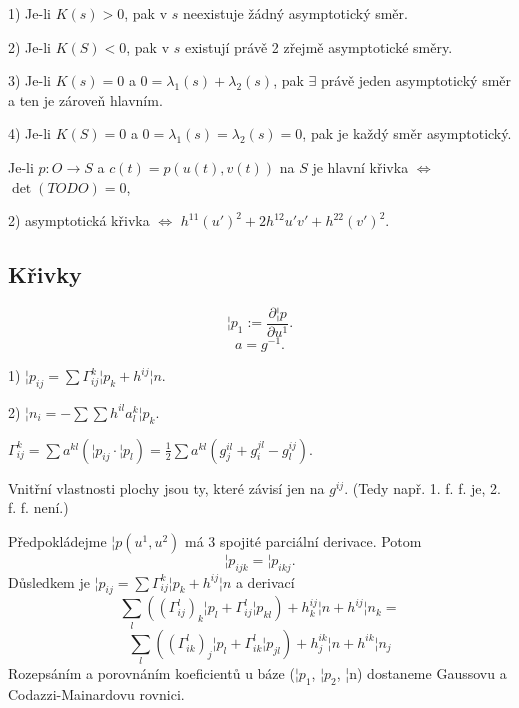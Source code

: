 \documentclass[12pt]{article}                   %
\begin{document}
        \begin{veta}
            1) Je-li $K(s)>0$, pak v $s$ neexistuje žádný asymptotický směr.

            2) Je-li $K(S) < 0$, pak v $s$ existují právě 2 zřejmě asymptotické směry.
            
            3) Je-li $K(s) = 0$ a $0 = \lambda_1(s) + \lambda_2(s)$, pak $\exists$ právě jeden asymptotický směr a ten je zároveň hlavním.

            4) Je-li $K(S) = 0$ a $0 = \lambda_1(s) = \lambda_2(s) = 0$, pak je každý směr asymptotický.
        \end{veta}

        \begin{veta}
            Je-li $p: O \rightarrow S$ a $c(t) = p(u(t), v(t))$ na $S$ je hlavní křivka $\Leftrightarrow$ $\det (TODO) = 0$,

            2) asymptotická křivka $\Leftrightarrow$ $h^{11}(u')^2 + 2h^{12}u'v' + h^{22}(v')^2$.
        \end{veta}


    \subsection{Křivky}
        \begin{poznamka}[Značení]
            $$ ¦p_1 := \frac{\partial ¦p}{\partial u^1}. $$
            $$ a = g^{-1}. $$ 
        \end{poznamka}

        \begin{lemma}
            1) $¦p_{ij} = \sum \Gamma_{ij}^k ¦p_k + h^{ij}¦n$.

            2) $¦n_i = - \sum \sum h^{il} a^k_l ¦p_k$.
        \end{lemma}

        \begin{definice}
            $\Gamma_{ij}^k = \sum a^{kl} (¦p_{ij}·¦p_l) = \frac{1}{2} \sum a^{kl} (g_j^{il} + g_i^{jl} - g_l^{ij})$.
        \end{definice}

        \begin{poznamka}
            Vnitřní vlastnosti plochy jsou ty, které závisí jen na $g^{ij}$. (Tedy např. 1. f. f. je, 2. f. f. není.)
        \end{poznamka}

        \begin{poznamka}
            Předpokládejme $¦p(u^1, u^2)$ má 3 spojité parciální derivace. Potom
            $$ ¦p_{ijk} = ¦p_{ikj}. $$ 
            Důsledkem je $¦p_{ij} = \sum \Gamma_{ij}^k ¦p_k + h^{ij}¦n$ a derivací
            $$ \sum_l ((\Gamma^l_{ij})_k¦p_l + \Gamma_{ij}^l¦p_{kl}) + h_k^{ij}¦n + h^{ij}¦n_k = $$ 
            $$ \sum_l ((\Gamma^l_{ik})_j¦p_l + \Gamma_{ik}^l¦p_{jl}) + h_j^{ik}¦n + h^{ik}¦n_j $$
            Rozepsáním a porovnáním koeficientů u báze ($¦p_1$, $¦p_2$, ¦n) dostaneme Gaussovu a Codazzi-Mainardovu rovnici.
        \end{poznamka}
\end{document}
